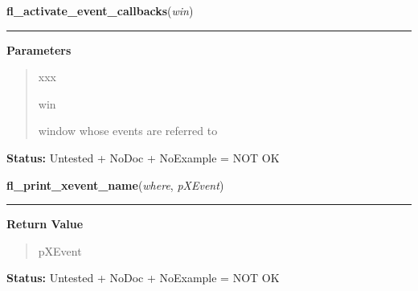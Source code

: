 \hspace{.8\funcindent}\begin{boxedminipage}{\funcwidth}

    \raggedright \textbf{fl\_activate\_event\_callbacks}(\textit{win})

    \vspace{-1.5ex}

    \rule{\textwidth}{0.5\fboxrule}
\setlength{\parskip}{2ex}
\setlength{\parskip}{1ex}
      \textbf{Parameters}
      \vspace{-1ex}

      \begin{quote}
        \begin{Ventry}{xxx}

          \item[win]

          window whose events are referred to

        \end{Ventry}

      \end{quote}

\textbf{Status:} Untested + NoDoc + NoExample = NOT OK



    \end{boxedminipage}

    \label{xformslib:library:fl_print_xevent_name}

    \vspace{0.5ex}

\hspace{.8\funcindent}\begin{boxedminipage}{\funcwidth}

    \raggedright \textbf{fl\_print\_xevent\_name}(\textit{where}, \textit{pXEvent})

    \vspace{-1.5ex}

    \rule{\textwidth}{0.5\fboxrule}
\setlength{\parskip}{2ex}
\setlength{\parskip}{1ex}
      \textbf{Return Value}
    \vspace{-1ex}

      \begin{quote}
      pXEvent

      \end{quote}

\textbf{Status:} Untested + NoDoc + NoExample = NOT OK



    \end{boxedminipage}

